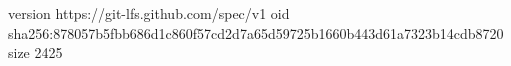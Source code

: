 version https://git-lfs.github.com/spec/v1
oid sha256:878057b5fbb686d1c860f57cd2d7a65d59725b1660b443d61a7323b14cdb8720
size 2425
